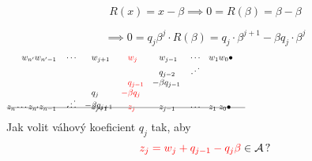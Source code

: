 \documentclass[11pt]{beamer}
\begin{document}
\begin{frame}
    $$R(x)= x-\beta \implies 0=R(\beta)=\beta -\beta$$%
    
    $$\implies 0=q_j \beta^j \cdot R(\beta) =q_j\cdot \beta^{j+1} -\beta  q_j \cdot \beta^{j}$$
    \pause
    \begin{align*}
        w_{n'} w_{n'-1}&&&\cdots& &w_{j+1}&\!\! &\textcolor{red}{w_j}  & \!\!  &w_{j-1} &&\cdots &&w_1 w_0\bullet \hspace{200pt}\\[-5pt]
                   &&&&       &       & &     &   &q_{j-2} &&\iddots\\[-3pt] 
                   &&&&       &       & &\textcolor{red}{q_{j-1}}& -&\beta q_{j-1} \\[-3pt]
                   &&&&         &q_j&   \textcolor{red}{-}&\textcolor{red}{\beta q_j} &&\\[-8pt]
                   &&&  \iddots      &   -&\beta q_{j+1}&   &\ &&\\[-17pt]
    \intertext{\line(1,0){280}}
    \vspace{-15pt}
    \\[-30pt]
     z_{n} \cdots z_{n'} z_{n-1}&&&\cdots& &z_{j+1}& &\textcolor{red}{z_j}& &z_{j-1} &&\cdots &&z_1 \; z_0\bullet                            
    \end{align*}
    \pause
    Jak volit váhový koeficient $q_j$ tak, aby
    $$
        \textcolor{red}{z_j=w_j + q_{j-1} - q_j \beta} \in \mathcal{A}\,?
    $$
        
\end{frame}
\end{document}
